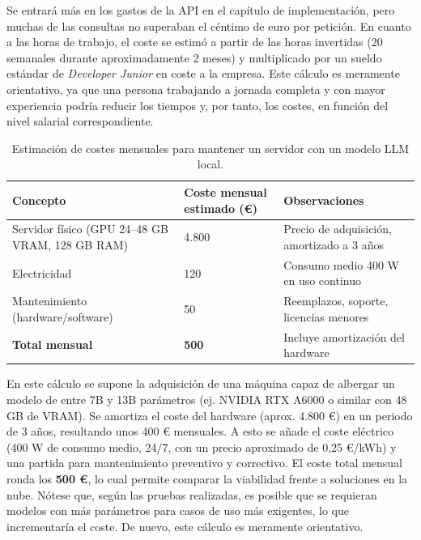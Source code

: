 Se entrará más en los gastos de la API en el capítulo de implementación, pero muchas de las consultas no superaban el céntimo de euro por petición.  
En cuanto a las horas de trabajo, el coste se estimó a partir de las horas invertidas (20 semanales durante aproximadamente 2 meses) y multiplicado por un sueldo estándar de \textit{Developer Junior} en coste a la empresa. Este cálculo es meramente orientativo, ya que una persona trabajando a jornada completa y con mayor experiencia podría reducir los tiempos y, por tanto, los costes, en función del nivel salarial correspondiente.


\begin{table}[H]
\centering
\begin{tabularx}{\textwidth}{|l|X|X|}
\hline
\textbf{Concepto} & \textbf{Coste mensual estimado (€)} & \textbf{Observaciones} \\ \hline
Servidor físico (GPU 24--48 GB VRAM, 128 GB RAM) & 4.800 & Precio de adquisición, amortizado a 3 años \\ \hline
Electricidad & 120 & Consumo medio 400 W en uso continuo \\ \hline
Mantenimiento (hardware/software) & 50 & Reemplazos, soporte, licencias menores \\ \hline
\textbf{Total mensual} & \textbf{500} & Incluye amortización del hardware \\ \hline
\end{tabularx}
\caption{Estimación de costes mensuales para mantener un servidor con un modelo LLM local.}
\label{tab:servidor}
\end{table}

En este cálculo se supone la adquisición de una máquina capaz de albergar un modelo de entre 7B y 13B parámetros (ej. NVIDIA RTX A6000 o similar con 48 GB de VRAM). Se amortiza el coste del hardware (aprox. 4.800 €) en un periodo de 3 años, resultando unos 400 € mensuales.  
A esto se añade el coste eléctrico (400 W de consumo medio, 24/7, con un precio aproximado de 0,25 €/kWh) y una partida para mantenimiento preventivo y correctivo.  
El coste total mensual ronda los \textbf{500 €}, lo cual permite comparar la viabilidad frente a soluciones en la nube. Nótese que, según las pruebas realizadas, es posible que se requieran modelos con más parámetros para casos de uso más exigentes, lo que incrementaría el coste. De nuevo, este cálculo es meramente orientativo.



